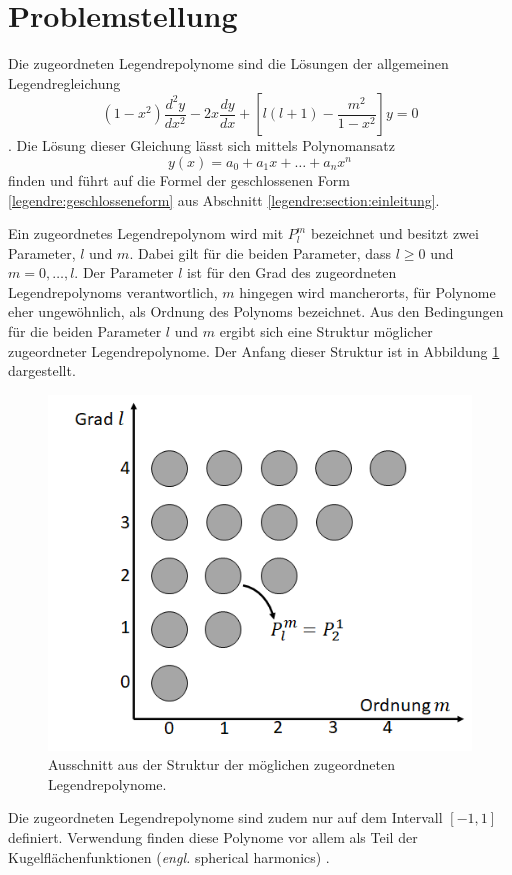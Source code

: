 %
%
%
\section{Problemstellung
\label{legendre:section:problemstellung}}
Die zugeordneten Legendrepolynome sind die Lösungen der allgemeinen Legendregleichung
\begin{equation}
(1-x^2) \frac{d^2y}{dx^2}
-2x \frac{dy}{dx}
+ \left[ l(l+1)- \frac{m^2}{1-x^2} \right] y
=0
\label{legendre:legendregleichung}
\end{equation}
\cite{legendre:assoc-legendre-poly-wolfram} \cite{legendre:assoc-legendre-diff-wolfram}.
Die Lösung dieser Gleichung lässt sich mittels Polynomansatz
\begin{equation}
y(x)=a_0+a_1x+ \ldots + a_nx^n
\label{legendre:polynomansatz}
\end{equation}
finden und führt auf die Formel der geschlossenen Form \eqref{legendre:geschlosseneform} aus Abschnitt \ref{legendre:section:einleitung}.

Ein zugeordnetes Legendrepolynom wird mit $P^m_l$ bezeichnet und besitzt zwei Parameter, $l$ und $m$.
Dabei gilt für die beiden Parameter, dass $l\geq 0$ und $m=0, \ldots , l$.
Der Parameter $l$ ist für den Grad des zugeordneten Legendrepolynoms verantwortlich, $m$ hingegen wird mancherorts, für Polynome eher ungewöhnlich, als Ordnung des Polynoms bezeichnet.
Aus den Bedingungen für die beiden Parameter $l$ und $m$ ergibt sich eine Struktur möglicher zugeordneter Legendrepolynome.
Der Anfang dieser Struktur ist in Abbildung \ref{legendre:fig:struktur} dargestellt.
\begin{figure}[!h]
\centering
\includegraphics[width=0.6\linewidth]{papers/legendre/plots/legendre_struktur}
\caption{Ausschnitt aus der Struktur der möglichen zugeordneten Legendrepolynome.}
\label{legendre:fig:struktur}
\end{figure}
Die zugeordneten Legendrepolynome sind zudem nur auf dem Intervall $[-1, 1]$ definiert.
Verwendung finden diese Polynome vor allem als Teil der Kugelflächenfunktionen (\textit{engl.} spherical harmonics) \cite{legendre:spherical-harmonic-wolfram}.

